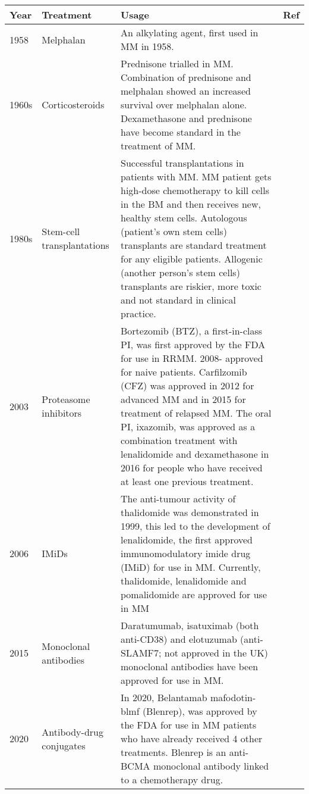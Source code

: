 %
%
\begin{table}[hpt]
\centering
\begin{tabular}{|p{1cm}|p{2.6cm}|p{8.5cm}|p{1.28cm}|}
\hline
\textbf{Year} & \textbf{Treatment} & \textbf{Usage} & \textbf{Ref} \\ \hline
1958 & Melphalan & An alkylating agent, first used in MM in 1958. & \cite{blokhin1958clinical} \\ \hline
1960s & Corticosteroids & Prednisone trialled in MM. Combination of prednisone and melphalan showed an increased survival over melphalan alone. Dexamethasone and prednisone have become standard in the treatment of MM. & \cite{mass1962comparison, alexanian1969treatment} \\ \hline
1980s & Stem-cell transplantations & Successful transplantations in patients with MM. MM patient gets high-dose chemotherapy to kill cells in the BM and then receives new, healthy stem cells. Autologous (patient's own stem cells) transplants are standard treatment for any eligible patients. Allogenic (another person's stem cells) transplants are riskier, more toxic and not standard in clinical practice. &  \cite{mcelwain1983high,osserman1982identical,fefer1986identical,gahrton1987bone,stemcellMM2022}  \\ \hline
2003 & Proteasome inhibitors & Bortezomib (BTZ), a first-in-class PI, was first approved by the FDA for use in RRMM. 2008- approved for naive patients. Carfilzomib (CFZ) was approved in 2012 for advanced MM and in 2015 for treatment of relapsed MM. The oral PI, ixazomib, was approved as a combination treatment with lenalidomide and dexamethasone in 2016 for people who have received at least one previous treatment. & \cite{kane2003velcade,richardson2003phase,katsnelson2012next} \\ \hline
2006 & IMiDs & The anti-tumour activity of thalidomide was demonstrated in 1999, this led to the development of lenalidomide, the first approved immunomodulatory imide drug (IMiD) for use in MM. Currently, thalidomide, lenalidomide and pomalidomide are approved for use in MM & \cite{singhal1999antitumor,label47revlimid,san2013pomalidomide} \\ \hline
2015 & Monoclonal antibodies & Daratumumab, isatuximab (both anti-CD38) and elotuzumab (anti-SLAMF7; not approved in the UK) monoclonal antibodies have been approved for use in MM. & \cite{lokhorst2015targeting,lonial2015elotuzumab} \\ \hline
2020 & Antibody-drug conjugates & In 2020, Belantamab mafodotin-blmf (Blenrep), was approved by the FDA for use in MM patients who have already received 4 other treatments. Blenrep is an anti-BCMA monoclonal antibody linked to a chemotherapy drug. & \cite{fdaBlenrep, markham2020belantamab} \\ \hline

\end{tabular}
\end{table}
